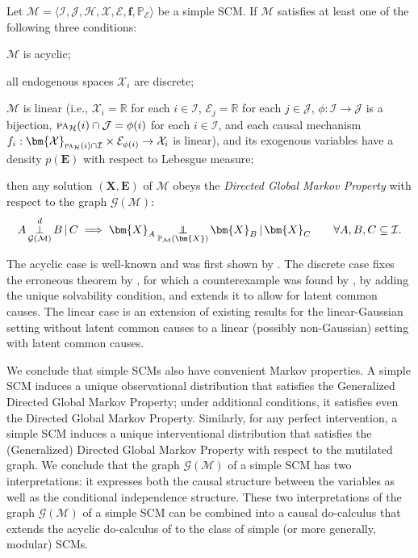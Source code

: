 \documentclass[twoside,11pt]{article}
\DeclareMathOperator*{\CI}{{\,\perp\mkern-12mu\perp\,}}
\DeclareMathOperator*{\SEP}{\perp}
\newcommand\indep[4]{{#1} \CI_{#4} {#2} \given {#3}}
\newcommand{\dsep}[4]{{#1} \SEP_{#4}^d {#2} \given {#3}}
\newcommand{\Prb}{\mathbb{P}}
\newcommand\B[1]{\bm{#1}}
\newcommand\C[1]{\mathcal{#1}}
\newcommand\BC[1]{\bm{\mathcal{#1}}}
\newcommand\mathbfsc[1]{\text{\normalfont\scshape#1}}
\newcommand\pasub[2]{\mathbfsc{pa}_{#1}(#2)}
\newcommand\given{\,|\,}
\newcommand{\RN}{\mathbb{R}}
\begin{document}
\begin{theorem}\label{thm:d_separation}
Let $\C{M} = \langle \C{I}, \C{J}, \C{H}, \BC{X}, \BC{E}, \B{f}, \Prb_{\BC{E}} \rangle$ be a simple SCM. If $\C{M}$ satisfies at least one of the following three conditions:
  \begin{compactenum}[(i)]
    \item $\C{M}$ is acyclic;
    \item all endogenous spaces $\C{X}_i$ are discrete;
    \item $\C{M}$ is linear (i.e., $\C{X}_i = \RN$ for each $i \in\C{I}$, $\C{E}_j = \RN$ for each $j\in\C{J}$, $\phi : \C{I} \to \C{J}$ is a bijection, $\pasub{\C{H}}{i} \cap \C{J} = \phi(i)$ for each $i \in \C{I}$, and each causal mechanism $f_i : \BC{X}_{\pasub{\C{H}}{i} \cap \C{I}} \times \C{E}_{\phi(i)} \to \C{X}_i$ is linear), and its exogenous variables have a density $p(\B{E})$ with respect to Lebesgue measure; 
  \end{compactenum}
then any solution $(\B{X},\B{E})$ of $\C{M}$ obeys the \emph{Directed Global Markov Property}
with respect to the graph $\C{G}(\C{M})$:
$$\dsep{A}{B}{C}{\C{G}(\C{M})} \implies \indep{\B{X}_A}{\B{X}_B}{\B{X}_C}{\Prb_{\C{M}}(\B{X})} \qquad \forall A,B,C \subseteq \C{I}.$$
\end{theorem}
The acyclic case is well-known and was first shown by \citet{Richardson2003}.
The discrete case fixes the erroneous theorem by \citet{PearlDechter96}, for which a
counterexample was found by \citet{Neal2000}, by adding the unique
solvability condition, and extends it to allow for latent common causes. 
The linear case is an extension of existing results for the linear-Gaussian setting 
without latent common causes \citep{Spirtes94,Koster96} to a linear (possibly
non-Gaussian) setting with latent common causes.

We conclude that simple SCMs also have convenient Markov
properties. A simple SCM induces a unique observational distribution that satisfies the Generalized 
Directed Global Markov Property; under additional conditions, it satisfies even the Directed Global
Markov Property. Similarly, for any perfect intervention, a simple SCM induces a unique interventional
distribution that satisfies the (Generalized) Directed Global Markov Property with respect to the 
mutilated graph. We conclude that the graph $\C{G}(\C{M})$ of a simple SCM has two interpretations:
it expresses both the causal structure between the variables as well as the conditional independence
structure. These two interpretations of the graph $\C{G}(\C{M})$ of a simple SCM can be combined 
into a causal do-calculus \citep{ForreMooij_UAI_19} that extends the acyclic do-calculus of \cite{Pearl2009}
to the class of simple (or more generally, modular) SCMs.
\end{document}
